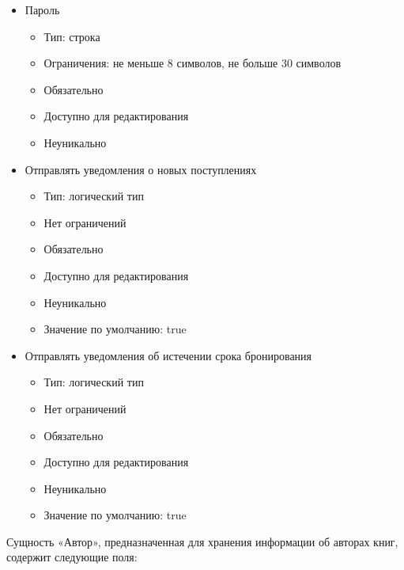 \documentclass[data-specification.tex]{subfiles}
\begin{document}
\begin{itemize}
\begin{itemize}
    \end{itemize}
    \item Пароль
    \begin{itemize}
        \item Тип: строка
        \item Ограничения: не меньше 8 символов, не больше 30 символов
        \item Обязательно
        \item Доступно для редактирования
        \item Неуникально
    \end{itemize}
    \item Отправлять уведомления о новых поступлениях
    \begin{itemize}
        \item Тип: логический тип
        \item Нет ограничений 
        \item Обязательно
        \item Доступно для редактирования
        \item Неуникально
        \item Значение по умолчанию: true
    \end{itemize}
    \item Отправлять уведомления об истечении срока бронирования
    \begin{itemize}
        \item Тип: логический тип
        \item Нет ограничений 
        \item Обязательно
        \item Доступно для редактирования
        \item Неуникально
        \item Значение по умолчанию: true
    \end{itemize}
\end{itemize}
\par
Сущность «Автор», предназначенная для хранения информации об авторах книг, содержит следующие поля:
\end{document}
